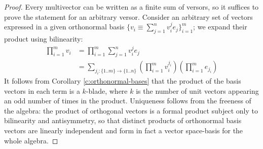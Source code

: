 \begin{proof}
	Every multivector can be written as a finite sum of versors, so it suffices to prove the statement for an arbitrary versor.
	Consider an arbitrary set of vectors expressed in a given orthonormal basis $\{v_i \equiv \sum_{j=1}^n v_i^je_j\}_{i=1}^m$; we expand their product using bilinearity:
	\begin{align*}
		\prod_{i=1}^m v_i &= \prod_{i=1}^m \sum_{j=1}^n v_i^j e_j \\
						  &= \sum_{j_i : \{1..m\} \to \{1..n\}} \left(\prod_{i=1}^m v_i^{j_i}\right) \left(\prod_{i=1}^m e_{j_i}\right)
	\end{align*}
	It follows from Corollary \ref{c:orthonormal-bases} that the product of the basis vectors in each term is a $k$-blade, where $k$ is the number of unit vectors appearing an odd number of times in the product.
	Uniqueness follows from the freeness of the algebra: the product of orthogonal vectors is a formal product subject only to bilinearity and antisymmetry, so that distinct products of orthonormal basis vectors are linearly independent and form in fact a vector space-basis for the whole algebra.
\end{proof}
